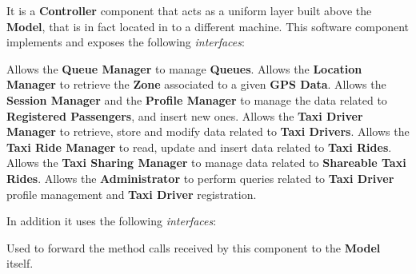 \begin{itemize}
\begin{itemize}
		 It is a \textbf{Controller} component that acts as a uniform layer built above the \textbf{Model}, that is in fact located in to a different machine.
		This software component implements and exposes the following \textit{interfaces}:
		\begin{itemize}
			 Allows the \textbf{Queue Manager} to manage \textbf{Queues}.
			 Allows the \textbf{Location Manager} to retrieve the \textbf{Zone} associated to a given \textbf{GPS Data}.
			 Allows the \textbf{Session Manager} and the \textbf{Profile Manager} to manage the data related to \textbf{Registered Passengers}, and insert new ones.
			 Allows the \textbf{Taxi Driver Manager} to retrieve, store and modify data related to \textbf{Taxi Drivers}.
			 Allows the \textbf{Taxi Ride Manager} to read, update and insert data related to \textbf{Taxi Rides}.
			 Allows the \textbf{Taxi Sharing Manager} to manage data related to \textbf{Shareable Taxi Rides}.
			 Allows the \textbf{Administrator} to perform queries related to \textbf{Taxi Driver} profile management and \textbf{Taxi Driver} registration.
		\end{itemize}
		In addition it uses the following \textit{interfaces}:
		\begin{itemize}
			 Used to forward the method calls received by this component to the \textbf{Model} itself.
		\end{itemize}
	\end{itemize}
	

\end{itemize}
